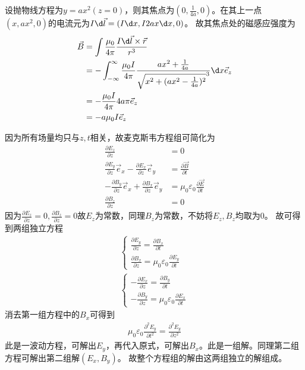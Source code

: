 \documentclass{phyasgn}
\begin{document}
\begin{sol}[3]
  设抛物线方程为$y=ax^2(z=0)$，则其焦点为$(0,\frac{1}{4a},0)$。在其上一点$(x,ax^2,0)$的电流元为$I\d \vec{l}=(I\d x,I2ax\d x,0)$。
  故其焦点处的磁感应强度为
  \begin{align*}
    \vec{B}&=\int\frac{\mu_0}{4\pi}\frac{I\d \vec{l}\times\vec{r}}{r^3}\\
    &=-\int_{-\infty}^{\infty}\frac{\mu_0I}{4\pi}\frac{ax^2+\frac{1}{4a}}{\sqrt{x^2+(ax^2-\frac{1}{4a})^2}^3}\d x\vec{e}_z\\
    &=-\frac{\mu_0I}{4\pi}4a\pi\vec{e}_z\\
    &=-a\mu_0I\vec{e}_z
  \end{align*}
\end{sol}\par

\begin{sol}[4]
   因为所有场量均只与$z,t$相关，故麦克斯韦方程组可简化为
   \begin{align*}
    \frac{\partial E_z}{\partial z}&=0\\
    \frac{\partial E_y}{\partial z}\vec{e}_x-\frac{\partial E_x}{\partial z}\vec{e}_y&=\frac{\partial \vec{B}}{\partial t}\\
    -\frac{\partial B_y}{\partial z}\vec{e}_x+\frac{\partial B_x}{\partial z}\vec{e}_y&=\mu_0\varepsilon_0\frac{\partial\vec{E}}{\partial t}\\
    \frac{\partial B_z}{\partial z}&=0
   \end{align*}
   因为$\frac{\partial E_z}{\partial z}=0,\frac{\partial B_z}{\partial z}=0$故$E_z$为常数，同理$B_z$为常数，不妨将$E_z,B_z$均取为0。
   故可得到两组独立方程
   \begin{align*}
    \left\{\begin{matrix}
      \frac{\partial E_y}{\partial z}=\frac{\partial B_x}{\partial t}\\
      \frac{\partial B_x}{\partial z}=\mu_0\varepsilon_0\frac{\partial E_y}{\partial t}
    \end{matrix}\right.\\
    \left\{\begin{matrix}
      -\frac{\partial E_x}{\partial z}=\frac{\partial B_y}{\partial t}\\
      -\frac{\partial B_y}{\partial z}=\mu_0\varepsilon_0\frac{\partial E_x}{\partial t}
    \end{matrix}\right.
   \end{align*}
   消去第一组方程中的$B_x$可得到
   \begin{align*}
    \mu_0\varepsilon_0\frac{\partial^2 E_y}{\partial t^2}=\frac{\partial^2 E_y}{\partial z^2}
   \end{align*}
   此是一波动方程，可解出$E_y$，再代入原式，可解出$B_x$。此是一组解。同理第二组方程可解出第二组解$(E_x,B_y)$。
   故整个方程组的解由这两组独立的解组成。
\end{sol}\par
\end{document}
